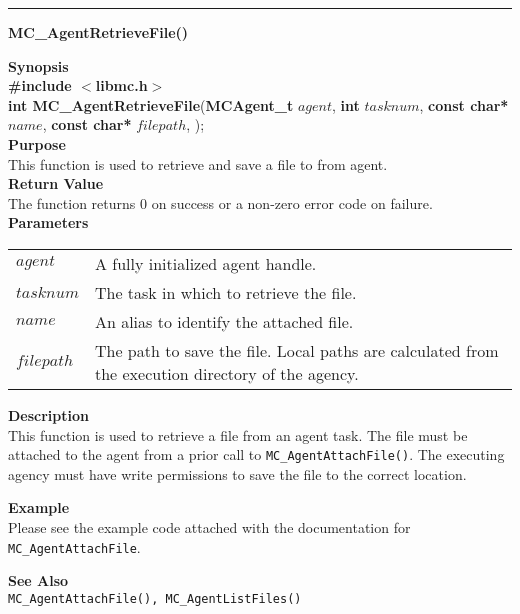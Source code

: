 \noindent
\vspace{5pt}
\rule{6.5in}{0.015in}
\noindent
{}
{\LARGE \bf MC\_AgentRetrieveFile()}\\

\noindent
{\bf Synopsis}\\
{\bf \#include $<$libmc.h$>$}\\
{\bf int MC\_AgentRetrieveFile}({\bf MCAgent\_t} $agent$, 
                                  {\bf int} $tasknum$,
                                  {\bf const char*} $name$,
                                  {\bf const char*} $filepath$,
																	);\\

\noindent
{\bf Purpose}\\
This function is used to retrieve and save a file to from agent.\\

\noindent
{\bf Return Value}\\
The function returns 0 on success or a non-zero error code on failure.\\

\noindent
{\bf Parameters}
\vspace{-0.1in}
\begin{description}
\item
\begin{tabular}{p{30 mm}p{125 mm}} 
$agent$ & A fully initialized agent handle.\\
$tasknum$ & The task in which to retrieve the file. \\
$name$ & An alias to identify the attached file.\\
$filepath$ & The path to save the file. Local paths are calculated from the
execution directory of the agency.\\
\end{tabular}
\end{description}

\noindent
{\bf Description}\\
This function is used to retrieve a file from an agent task. The file must
be attached to the agent from a prior call to \texttt{MC\_AgentAttachFile()}. 
The executing agency must have write permissions to save the file to the
correct location.

\noindent
{\bf Example}\\
\noindent
Please see the example code attached with the documentation for \texttt{MC\_AgentAttachFile}.

\noindent
{\bf See Also}\\
\texttt{MC\_AgentAttachFile(), MC\_AgentListFiles()}

